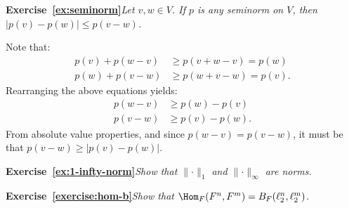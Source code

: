    \textbf{Exercise~\ref{ex:seminorm}}\hspace{4pt}\textit{Let $v,w \in V$. If $p$ is any seminorm on $V$, then $|p(v) - p(w)| \leq p(v-w)$.}
        \begin{solution}
            Note that:
                \begin{equation*}
                \begin{split}
                    p(v) + p(w-v) &\geq p(v+w-v) = p(w) \\
                    p(w) + p(v-w) &\geq p(w + v - w) = p(v).
                \end{split}
                \end{equation*}
            Rearranging the above equations yields:
                \begin{equation*}
                \begin{split}
                    p(w-v) & \geq p(w) - p(v) \\
                    p(v-w) & \geq p(v) - p(w).
                \end{split}
                \end{equation*}
            From absolute value properties, and since $p(w-v) = p(v-w)$, it must be that $p(v-w) \geq |p(v) - p(w)|$.
        \end{solution}
        \vspace{8pt}

    \textbf{Exercise~\ref{ex:1-infty-norm}}\hspace{4pt}\textit{Show that $\lVert \cdot \rVert _1$ and $\lVert \cdot \rVert _\infty$ are norms.}
        \begin{solution}
                    
        \end{solution}
        \vspace{8pt}

    \textbf{Exercise~\ref{exercise:hom-b}}\hspace{4pt}\textit{Show that $\Hom_F(F^n,F^m) = B_F(\ell_2^n,\ell_2^m)$.}
        \begin{solution}
                    
        \end{solution}
        \vspace{8pt}

    